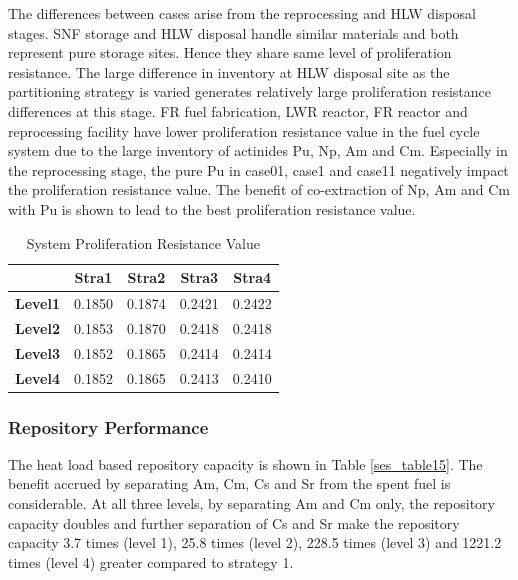 The differences between cases arise from the reprocessing and HLW
disposal stages.  SNF storage and HLW disposal handle similar materials
and both represent pure storage sites.  Hence they share same level of
proliferation resistance. The large difference in inventory at HLW
disposal site as the partitioning strategy is varied generates
relatively large proliferation resistance differences at this stage.  FR
fuel fabrication, LWR reactor, FR reactor and reprocessing facility have
lower proliferation resistance value in the fuel cycle system due to the
large inventory of actinides Pu, Np, Am and Cm. Especially in the
reprocessing stage, the pure Pu in case01, case1 and case11 negatively
impact the proliferation resistance value.  The benefit of co-extraction
of Np, Am and Cm with Pu is shown to lead to the best proliferation
resistance value.

\begin{table}[htbp]
\begin{center}
\caption{System Proliferation Resistance Value}
\label{ses_table14}
\begin{tabular}{|l|c|c|c|c|}
\hline
                & \textbf{Stra1} & \textbf{Stra2} & \textbf{Stra3} & \textbf{Stra4} \\
\hline
\textbf{Level1} & 0.1850         & 0.1874         & 0.2421         & 0.2422 \\
\textbf{Level2} & 0.1853         & 0.1870         & 0.2418         & 0.2418 \\
\textbf{Level3} & 0.1852         & 0.1865         & 0.2414         & 0.2414 \\
\textbf{Level4} & 0.1852         & 0.1865         & 0.2413         & 0.2410 \\
\hline
\end{tabular}
\end{center}
\end{table}



\subsubsection{Repository Performance}
\label{ses_sec:rep_perform}
The heat load based repository capacity is shown in Table \ref{ses_table15}.  The
benefit accrued by separating Am, Cm, Cs and Sr from the spent fuel is
considerable. At all three levels, by separating Am and Cm only, the
repository capacity doubles and further separation of Cs and Sr make the
repository capacity 3.7 times (level 1), 25.8 times (level 2), 228.5
times (level 3) and 1221.2 times (level 4) greater compared to strategy
1. 

